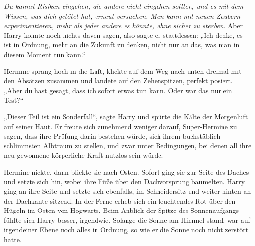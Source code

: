 \emph{Du kannst Risiken eingehen, die andere nicht eingehen sollten, und es mit dem Wissen, was dich getötet hat, erneut versuchen. Man kann mit neuen Zaubern experimentieren, mehr als jeder andere es könnte, ohne sicher zu sterben.}
Aber Harry konnte noch nichts davon sagen, also sagte er stattdessen: „Ich denke, es ist in Ordnung, mehr an die Zukunft zu denken, nicht nur an das, was man in diesem Moment tun kann.“

Hermine sprang hoch in die Luft, klickte auf dem Weg nach unten dreimal mit den Absätzen zusammen und landete auf den Zehenspitzen, perfekt posiert.
„Aber du hast gesagt, dass ich sofort etwas tun kann. Oder war das nur ein Test?“

„Dieser Teil ist ein Sonderfall“, sagte Harry und spürte die Kälte der Morgenluft auf seiner Haut.
Er freute sich zunehmend weniger darauf, Super-Hermine zu sagen, dass ihre Prüfung darin bestehen würde, sich ihrem buchstäblich schlimmsten Albtraum zu stellen, und zwar unter Bedingungen, bei denen all ihre neu gewonnene körperliche Kraft nutzlos sein würde.

Hermine nickte, dann blickte sie nach Osten. Sofort ging sie zur Seite des Daches und setzte sich hin, wobei ihre Füße über den Dachvorsprung baumelten. Harry ging an ihre Seite und setzte sich ebenfalls, im Schneidersitz und weiter hinten an der Dachkante sitzend.
In der Ferne erhob sich ein leuchtendes Rot über den Hügeln im Osten von Hogwarts.
Beim Anblick der Spitze des Sonnenaufgangs fühlte sich Harry besser, irgendwie. Solange die Sonne am Himmel stand, war auf irgendeiner Ebene noch alles in Ordnung, so wie er die Sonne noch nicht zerstört hatte.

